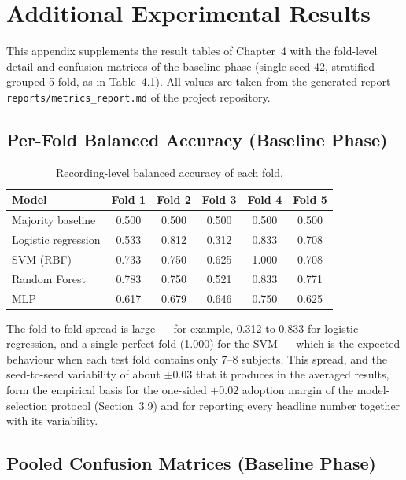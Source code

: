 \chapter{Additional Experimental Results}
\label{app:results}

This appendix supplements the result tables of Chapter~4 with the
fold-level detail and confusion matrices of the baseline phase
(single seed 42, stratified grouped 5-fold, as in
Table~4.1). All values are taken from the generated report
\texttt{reports/metrics\_report.md} of the project repository.

\section{Per-Fold Balanced Accuracy (Baseline Phase)}

\begin{table}[htb]
\centering
\caption{Recording-level balanced accuracy of each fold.}
\label{tab:perfold}
\begin{tabular}{lccccc}
\toprule
Model & Fold 1 & Fold 2 & Fold 3 & Fold 4 & Fold 5 \\
\midrule
Majority baseline   & 0.500 & 0.500 & 0.500 & 0.500 & 0.500 \\
Logistic regression & 0.533 & 0.812 & 0.312 & 0.833 & 0.708 \\
SVM (RBF)           & 0.733 & 0.750 & 0.625 & 1.000 & 0.708 \\
Random Forest       & 0.783 & 0.750 & 0.521 & 0.833 & 0.771 \\
MLP                 & 0.617 & 0.679 & 0.646 & 0.750 & 0.625 \\
\bottomrule
\end{tabular}
\end{table}

The fold-to-fold spread is large --- for example, 0.312 to 0.833 for
logistic regression, and a single perfect fold (1.000) for the SVM ---
which is the expected behaviour when each test fold contains only
7--8 subjects. This spread, and the seed-to-seed variability of about
$\pm 0.03$ that it produces in the averaged results, form the
empirical basis for the one-sided $+0.02$ adoption margin of the
model-selection protocol (Section~3.9) and for reporting every
headline number together with its variability.

\section{Pooled Confusion Matrices (Baseline Phase)}

